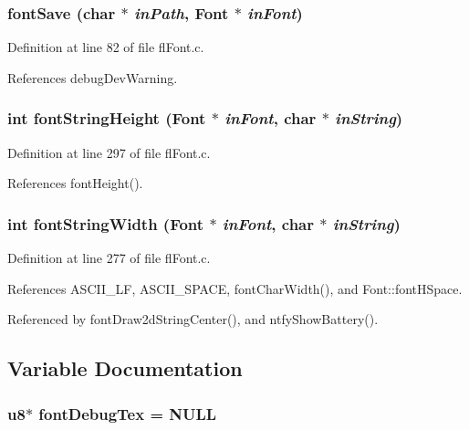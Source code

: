 \subsubsection{ font\-Save (char $\ast$ {\em in\-Path}, {\bf Font} $\ast$ {\em in\-Font})}\label{flFont_8c_9ff5be1b2dc43f06e50f98f7215de099}




Definition at line 82 of file fl\-Font.c.

References debug\-Dev\-Warning.
\subsubsection{\setlength{\rightskip}{0pt plus 5cm}int font\-String\-Height ({\bf Font} $\ast$ {\em in\-Font}, char $\ast$ {\em in\-String})}\label{flFont_8c_9b818f638545e3ddd7720598f9633d13}




Definition at line 297 of file fl\-Font.c.

References font\-Height().
\subsubsection{\setlength{\rightskip}{0pt plus 5cm}int font\-String\-Width ({\bf Font} $\ast$ {\em in\-Font}, char $\ast$ {\em in\-String})}\label{flFont_8c_d75ea5a21fc0145cf0509698bbd57ed4}




Definition at line 277 of file fl\-Font.c.

References ASCII\_\-LF, ASCII\_\-SPACE, font\-Char\-Width(), and Font::font\-HSpace.

Referenced by font\-Draw2d\-String\-Center(), and ntfy\-Show\-Battery().

\subsection{Variable Documentation}
\subsubsection{\setlength{\rightskip}{0pt plus 5cm}u8$\ast$ {\bf font\-Debug\-Tex} = NULL}\label{flFont_8c_15856dc4b3f06ce8ab011570ab980871}




